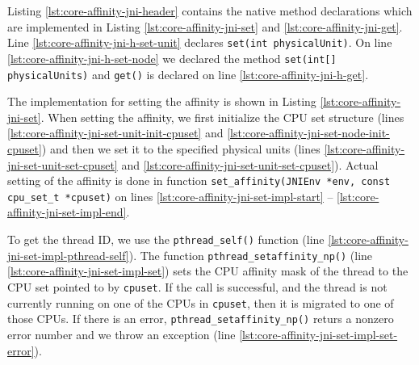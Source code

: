 

Listing \ref{lst:core-affinity-jni-header} contains the native method
declarations which are implemented in Listing
\ref{lst:core-affinity-jni-set} and
\ref{lst:core-affinity-jni-get}. Line
\ref{lst:core-affinity-jni-h-set-unit} declares
\lstinline!set(int physicalUnit)!. On line
\ref{lst:core-affinity-jni-h-set-node} we declared the method
\lstinline!set(int[] physicalUnits)! and \lstinline!get()! is declared
on line \ref{lst:core-affinity-jni-h-get}.



\newpage



\newpage

The implementation for setting the affinity is shown in Listing
\ref{lst:core-affinity-jni-set}. When setting the affinity, we first
initialize the CPU set structure (lines
\ref{lst:core-affinity-jni-set-unit-init-cpuset} and
\ref{lst:core-affinity-jni-set-node-init-cpuset}) and then we set it
to the specified physical units (lines
\ref{lst:core-affinity-jni-set-unit-set-cpuset} and
\ref{lst:core-affinity-jni-set-unit-set-cpuset}). Actual setting of
the affinity is done in function
\lstinline!set_affinity(JNIEnv *env, const cpu_set_t *cpuset)! on lines
\ref{lst:core-affinity-jni-set-impl-start} --
\ref{lst:core-affinity-jni-set-impl-end}.

To get the thread ID, we use the \lstinline!pthread_self()! function
(line \ref{lst:core-affinity-jni-set-impl-pthread-self}). The function
\lstinline!pthread_setaffinity_np()! (line
\ref{lst:core-affinity-jni-set-impl-set}) sets the CPU affinity mask
of the thread to the CPU set pointed to by \lstinline!cpuset!.  If the
call is successful, and the thread is not currently running on one of
the CPUs in \lstinline!cpuset!, then it is migrated to one of those
CPUs. If there is an error, \lstinline!pthread_setaffinity_np()!
returs a nonzero error number and we throw an exception (line
\ref{lst:core-affinity-jni-set-impl-set-error}).


